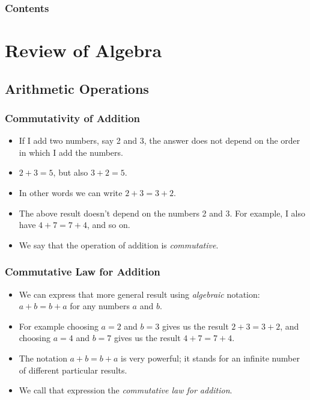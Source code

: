 \documentclass[serif,ignorenonframetext]{beamer}
\title{\commonTitleZeroZeroOne}
\subtitle{\commonSubtitleZeroZeroOne}
\author{\commonAuthor}
\institute{\commonInstitute}
\date{\commonDateZeroZeroOne}
\begin{document}

\begin{frame}
  \titlepage
\end{frame}

\begin{frame}
  \frametitle{Contents}
  \tableofcontents
\end{frame}


\section{Review of Algebra}

\subsection{Arithmetic Operations}

\begin{frame}
  \frametitle{Commutativity of Addition}
  \begin{itemize}[<+->]
  \item If I add two numbers, say 2 and 3, the answer does not depend
    on the order in which I add the numbers.
  \item $2+3=5$, but also $3+2=5$.
  \item In other words we can write $2+3=3+2$.
  \item The above result doesn't depend on the numbers 2 and 3.  For example,
    I also have $4+7=7+4$, and so on.
  \item We say that the operation of addition is \textit{commutative}.
  \end{itemize}
\end{frame}

\begin{frame}
  \frametitle{Commutative Law for Addition}
  \begin{itemize}[<+->]
  \item We can express that more general result using \textit{algebraic}
    notation: $a+b=b+a$ for any numbers $a$ and $b$.
  \item For example choosing $a=2$ and $b=3$ gives us the result $2+3=3+2$,
    and choosing $a=4$ and $b=7$ gives us the result $4+7=7+4$.
  \item The notation $a+b=b+a$ is very powerful; it stands for an infinite
    number of different particular results.
  \item We call that expression the \textit{commutative law for addition}.
  \end{itemize}
\end{frame}
\end{document}
